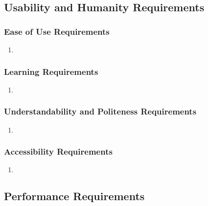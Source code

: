 \documentclass[english]{article}
\begin{document}

\subsection{Usability and Humanity Requirements}
\label{sub:usability_and_humanity_requirements}

\subsubsection{Ease of Use Requirements}
\label{ssub:ease_of_use_requirements}
\begin{enumerate}[{EUR}1. ]
\item
\end{enumerate}


\subsubsection{Learning Requirements}
\label{ssub:learning_requirements}
\begin{enumerate}[{LR}1. ]
\item
\end{enumerate}

\subsubsection{Understandability and Politeness Requirements}
\label{ssub:understandability_and_politeness_requirements}
\begin{enumerate}[{UPR}1. ]
\item
\end{enumerate}

\subsubsection{Accessibility Requirements}
\label{ssub:accessibility_requirements}
\begin{enumerate}[{ACR}1. ]
\item
\end{enumerate}


\subsection{Performance Requirements}
\label{sub:performance_requirements}
\end{document}

